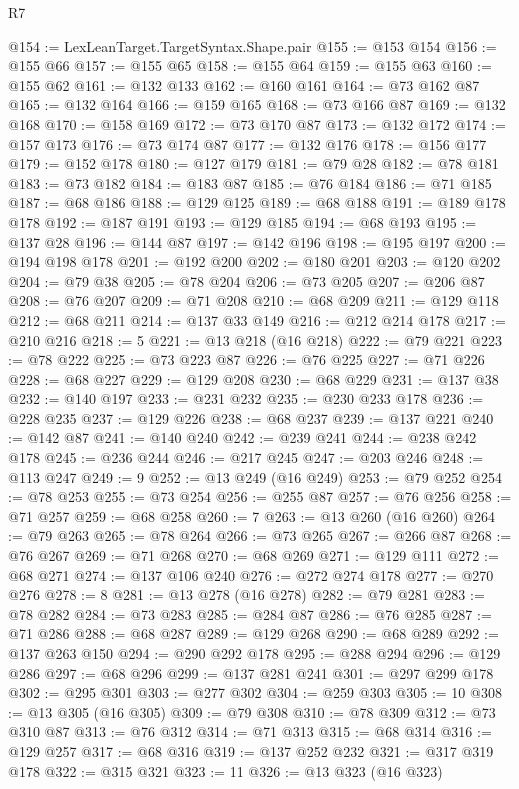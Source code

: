 \begin{lexlean}{R7}
\begin{coremodule}
@154 := LexLeanTarget.TargetSyntax.Shape.pair
@155 := @153 @154
@156 := @155 @66
@157 := @155 @65
@158 := @155 @64
@159 := @155 @63
@160 := @155 @62
@161 := @132 @133
@162 := @160 @161
@164 := @73 @162 @87
@165 := @132 @164
@166 := @159 @165
@168 := @73 @166 @87
@169 := @132 @168
@170 := @158 @169
@172 := @73 @170 @87
@173 := @132 @172
@174 := @157 @173
@176 := @73 @174 @87
@177 := @132 @176
@178 := @156 @177
@179 := @152 @178
@180 := @127 @179
@181 := @79 @28
@182 := @78 @181
@183 := @73 @182
@184 := @183 @87
@185 := @76 @184
@186 := @71 @185
@187 := @68 @186
@188 := @129 @125
@189 := @68 @188
@191 := @189 @178 @178
@192 := @187 @191
@193 := @129 @185
@194 := @68 @193
@195 := @137 @28
@196 := @144 @87
@197 := @142 @196
@198 := @195 @197
@200 := @194 @198 @178
@201 := @192 @200
@202 := @180 @201
@203 := @120 @202
@204 := @79 @38
@205 := @78 @204
@206 := @73 @205
@207 := @206 @87
@208 := @76 @207
@209 := @71 @208
@210 := @68 @209
@211 := @129 @118
@212 := @68 @211
@214 := @137 @33 @149
@216 := @212 @214 @178
@217 := @210 @216
@218 := 5
@221 := @13 @218 (@16 @218)
@222 := @79 @221
@223 := @78 @222
@225 := @73 @223 @87
@226 := @76 @225
@227 := @71 @226
@228 := @68 @227
@229 := @129 @208
@230 := @68 @229
@231 := @137 @38
@232 := @140 @197
@233 := @231 @232
@235 := @230 @233 @178
@236 := @228 @235
@237 := @129 @226
@238 := @68 @237
@239 := @137 @221
@240 := @142 @87
@241 := @140 @240
@242 := @239 @241
@244 := @238 @242 @178
@245 := @236 @244
@246 := @217 @245
@247 := @203 @246
@248 := @113 @247
@249 := 9
@252 := @13 @249 (@16 @249)
@253 := @79 @252
@254 := @78 @253
@255 := @73 @254
@256 := @255 @87
@257 := @76 @256
@258 := @71 @257
@259 := @68 @258
@260 := 7
@263 := @13 @260 (@16 @260)
@264 := @79 @263
@265 := @78 @264
@266 := @73 @265
@267 := @266 @87
@268 := @76 @267
@269 := @71 @268
@270 := @68 @269
@271 := @129 @111
@272 := @68 @271
@274 := @137 @106 @240
@276 := @272 @274 @178
@277 := @270 @276
@278 := 8
@281 := @13 @278 (@16 @278)
@282 := @79 @281
@283 := @78 @282
@284 := @73 @283
@285 := @284 @87
@286 := @76 @285
@287 := @71 @286
@288 := @68 @287
@289 := @129 @268
@290 := @68 @289
@292 := @137 @263 @150
@294 := @290 @292 @178
@295 := @288 @294
@296 := @129 @286
@297 := @68 @296
@299 := @137 @281 @241
@301 := @297 @299 @178
@302 := @295 @301
@303 := @277 @302
@304 := @259 @303
@305 := 10
@308 := @13 @305 (@16 @305)
@309 := @79 @308
@310 := @78 @309
@312 := @73 @310 @87
@313 := @76 @312
@314 := @71 @313
@315 := @68 @314
@316 := @129 @257
@317 := @68 @316
@319 := @137 @252 @232
@321 := @317 @319 @178
@322 := @315 @321
@323 := 11
@326 := @13 @323 (@16 @323)

\end{coremodule}
\end{lexlean}
